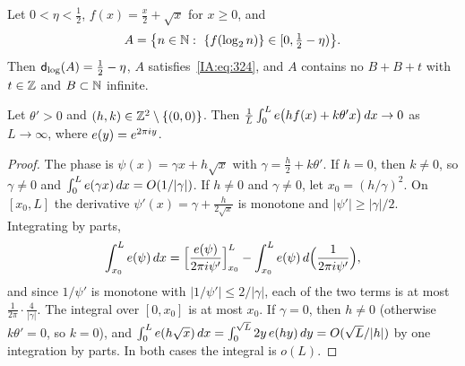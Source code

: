 \begin{theorem}\label{IA:thm:324}
Let $0<\eta<\frac12$, $f(x)=\frac x2+\sqrt x$ for $x\ge0$, and
\[
A=\big\{n\in\N:\ \{f(\log_2n)\}\in[0,\tfrac12-\eta)\big\}.
\]
Then $\mathsf{d}_{\log}(A)=\frac12-\eta$, $A$ satisfies~\eqref{IA:eq:324}, and $A$ contains no $B+B+t$ with
$t\in\mathbb{Z}$ and $B\subset\mathbb{N}$ infinite.
\end{theorem}

\begin{lemma}\label{IA:lem:oscint}
Let $\theta'>0$ and $(h,k)\in\mathbb{Z}^2\setminus\{(0,0)\}$. Then
$\frac1L\int_0^Le\big(hf(x)+k\theta'x\big)\,dx\to0$ as $L\to\infty$, where $e(y)=e^{2\pi iy}$.
\end{lemma}

\begin{proof}
The phase is $\psi(x)=\gamma x+h\sqrt x$ with $\gamma=\frac h2+k\theta'$. If $h=0$, then $k\ne0$, so
$\gamma\ne0$ and $\int_0^Le(\gamma x)\,dx=O(1/|\gamma|)$. If $h\ne0$ and $\gamma\ne0$, let
$x_0=(h/\gamma)^2$. On $[x_0,L]$ the derivative $\psi'(x)=\gamma+\frac h{2\sqrt x}$ is monotone and
$|\psi'|\ge|\gamma|/2$. Integrating by parts,
\[
\int_{x_0}^Le(\psi)\,dx=\Big[\frac{e(\psi)}{2\pi i\psi'}\Big]_{x_0}^L
-\int_{x_0}^Le(\psi)\,d\Big(\frac1{2\pi i\psi'}\Big),
\]
and since $1/\psi'$ is monotone with $|1/\psi'|\le2/|\gamma|$, each of the two terms is at most
$\frac{1}{2\pi}\cdot\frac{4}{|\gamma|}$.
The integral over $[0,x_0]$ is at most $x_0$. If $\gamma=0$, then $h\ne0$ (otherwise $k\theta'=0$, so
$k=0$), and $\int_0^Le(h\sqrt x)\,dx=\int_0^{\sqrt L}2y\,e(hy)\,dy=O(\sqrt L/|h|)$ by one
integration by parts. In both cases the integral is $o(L)$.
\end{proof}

